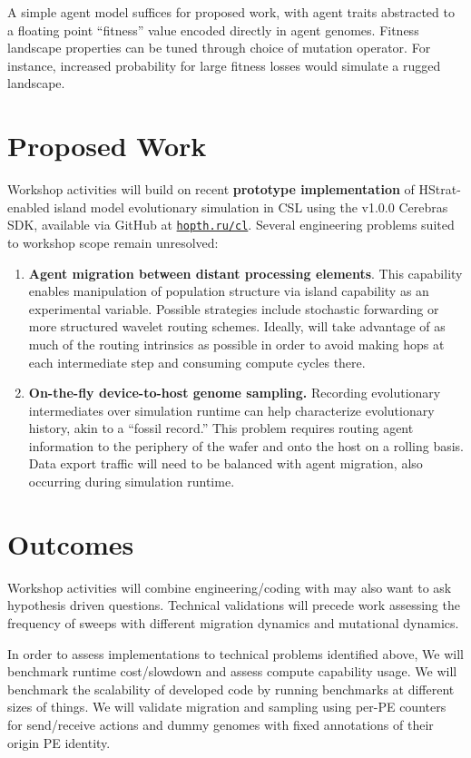 A simple agent model suffices for proposed work, with agent traits abstracted to a floating point ``fitness'' value encoded directly in agent genomes.
Fitness landscape properties can be tuned through choice of mutation operator.
For instance, increased probability for large fitness losses would simulate a rugged landscape.

\section{Proposed Work}

Workshop activities will build on recent \textbf{prototype implementation} of HStrat-enabled island model evolutionary simulation in CSL using the v1.0.0 Cerebras SDK, available via GitHub at \texttt{\href{https://hopth.ru/cl}{hopth.ru/cl}}.
Several engineering problems suited to workshop scope remain unresolved:
\begin{enumerate}
\item \textbf{Agent migration between distant processing elements}.
This capability enables manipulation of population structure via island capability as an experimental variable.
Possible strategies include stochastic forwarding or more structured wavelet routing schemes.
Ideally, will take advantage of as much of the routing intrinsics as possible in order to avoid making hops at each intermediate step and consuming compute cycles there.

\item \textbf{On-the-fly device-to-host genome sampling.}
Recording evolutionary intermediates over simulation runtime can help characterize evolutionary history, akin to a ``fossil record.''
This problem requires routing agent information to the periphery of the wafer and onto the host on a rolling basis.
Data export traffic will need to be balanced with agent migration, also occurring during simulation runtime.
\end{enumerate}

\section{Outcomes}

Workshop activities will combine engineering/coding with may also want to ask hypothesis driven questions.
Technical validations will precede work assessing the frequency of sweeps with different migration dynamics and mutational dynamics.

In order to assess implementations to technical problems identified above,
We will benchmark runtime cost/slowdown and assess compute capability usage.
We will benchmark the scalability of developed code by running benchmarks at different sizes of things.
We will validate migration and sampling using per-PE counters for send/receive actions and dummy genomes with fixed annotations of their origin PE identity.

